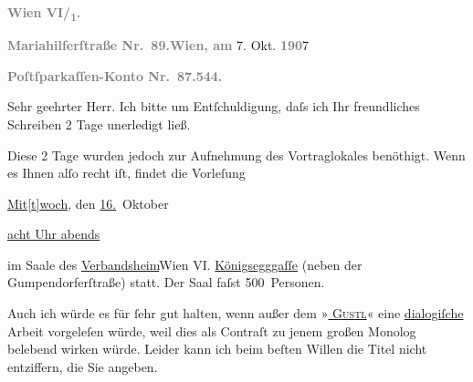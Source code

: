 \pstart
           \textcolor{gray}{\textbf{Wien VI/\textsubscript{1}.}}\pend
           
\pstart
           \textcolor{gray}{\textbf{Mariahilferſtraße Nr. 89.}}\hfill \textcolor{gray}{\textbf{Wien, am}} 7. Okt. \textcolor{gray}{\textbf{190}}7\pend
           
\pstart
           \textcolor{gray}{\textbf{Poſtſparkaſſen-Konto Nr. 87.544.}}\pend
           
\pstart\center{}Sehr geehrter Herr.\pend\vspace{0.5em}
\pstart
           Ich bitte um Entſchuldigung, daſs ich Ihr freundliches Schreiben 2 Tage unerledigt
               ließ.\pend
           
\pstart
           Diese 2 Tage wurden jedoch zur Aufnehmung des Vortraglokales benöthigt. Wenn es Ihnen
               alſo recht iſt, findet die Vorleſung\pend
           
\pstart
           \centering{}\uline{Mit{[}t{]}woch}, den \uline{16.} Oktober\pend
           
\pstart
           \centering{}\uline{acht Uhr abends}\pend
           
\pstart
           im Saale des \uline{Verbandsheim}Wien VI. \uline{Königsegggaſſe} (neben der Gumpendorferſtraße) statt. Der
               Saal faſst 500 Personen.\pend
           
\pstart
           Auch ich würde es für{ }ſehr gut halten, wenn außer {\pb}dem »\textsc{\uline{\label{T_L01717-1v}\label{T_L01717-1}}}\textsc{\uline{{ }Gustl}}« eine \uline{dialogiſche} Arbeit vorgeleſen würde, weil
               dies als Contraſt zu jenem großen  Monolog
               belebend wirken würde. Leider kann ich beim beſten Willen die  Titel nicht entziffern, die Sie angeben.\pend
           
